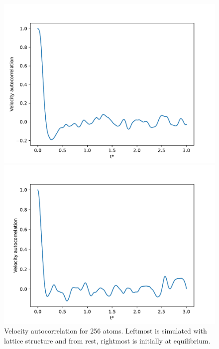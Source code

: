 \documentclass[a4paper,10pt,english]{article}
\begin{document}
\begin{figure}[h]
    \centering
    \begin{minipage}{0.5\textwidth}
        \centering
        \includegraphics[scale=0.5]{../figures/4_b_ii.pdf}
    \end{minipage}\hfill
    \begin{minipage}{0.5\textwidth}
        \centering
        \includegraphics[scale=0.5]{../figures/4_b_iii.pdf}
    \end{minipage}
    \caption{Velocity autocorrelation for 256 atoms. Leftmost is simulated with lattice structure and from rest, rightmost is initially at equilibrium.}
    \label{fig:vac}
\end{figure}
\end{document}
